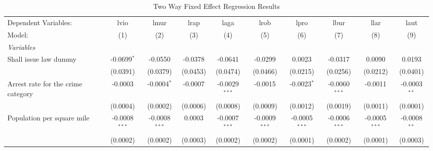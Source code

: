 \documentclass{article}
\begin{document}
    \scriptsize
\begin{landscape}
\begin{longtable}{@{\extracolsep{5pt}}lccccccccc}
  \caption{Two Way Fixed Effect Regression Results} 
  \label{tab:twfe}
   \tabularnewline \midrule \midrule
   Dependent Variables: & lvio                          & lmur                    & lrap                          & laga                         & lrob                        & lpro                         & lbur                    & llar                          & laut\\  
   Model:               & (1)                           & (2)                     & (3)                           & (4)                          & (5)                         & (6)                          & (7)                     & (8)                           & (9)\\  
   \midrule
   \emph{Variables}\\
   Shall issue law dummy               & -0.0699$^{*}$                 & -0.0550                 & -0.0378                       & -0.0641                      & -0.0299                     & 0.0023                       & -0.0317                 & 0.0090                        & 0.0193\\   
                        & (0.0391)                      & (0.0379)                & (0.0453)                      & (0.0474)                     & (0.0466)                    & (0.0215)                     & (0.0256)                & (0.0212)                      & (0.0401)\\
Arrest rate for the crime category & -0.0003 & -0.0004$^{*}$ & -0.0007 & -0.0029$^{***}$ & -0.0015& -0.0023$^{*}$ &  -0.0060$^{***}$& -0.0011 &-0.0003$^{**}$\\
 & (0.0004)&(0.0002) &(0.0006) & (0.0008)&(0.0009)& (0.0012)& (0.0019)& (0.0011)& (0.0001)\\   
  Population per square mile              & -0.0008$^{***}$               & -0.0008$^{***}$         & 0.0003                        & -0.0007$^{***}$              & -0.0009$^{***}$             & -0.0005$^{***}$              & -0.0006$^{***}$         & -0.0005$^{***}$               & -0.0008$^{**}$\\   
                        & (0.0002)                      & (0.0002)                & (0.0003)                      & (0.0002)                     & (0.0002)                    & (0.0001)                     & (0.0002)                & (0.0001)                      & (0.0003)\\ 

\end{longtable}
\end{landscape}
\end{document}
